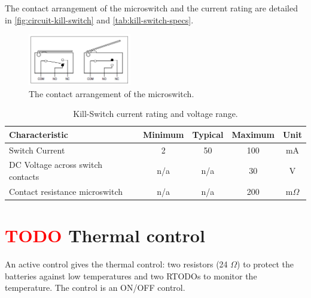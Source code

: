 The contact arrangement of the microswitch and the current rating are detailed in \autoref{fig:circuit-kill-switch} and \autoref{tab:kill-switch-specs}.

\begin{figure}[!ht]
    \begin{center}
        \includegraphics[width=0.4\textwidth]{figures/subsystems/circuit-kill-switch}
        \caption{The contact arrangement of the microswitch.}
        \label{fig:circuit-kill-switch}
    \end{center}
\end{figure}

\begin{table}[!h]
    \centering
    \begin{tabular}{lcccc}
        \toprule[1.5pt]
        \textbf{Characteristic} & \textbf{Minimum} & \textbf{Typical} & \textbf{Maximum} & \textbf{Unit} \\
        \midrule
        Switch Current                      & 2     & 50    & 100   & mA \\
        DC Voltage across switch contacts   & n/a   & n/a   & 30    & V \\
        Contact resistance microswitch      & n/a   & n/a   & 200   & m$\Omega$ \\
        \bottomrule[1.5pt]
    \end{tabular}
    \caption{Kill-Switch current rating and voltage range.}
    \label{tab:kill-switch-specs}
\end{table}


\section{ \textcolor{red}{TODO} Thermal control}

An active control gives the thermal control: two resistors (24 $\Omega$) to protect the batteries against low temperatures and two RTODOs to monitor the temperature. The control is an ON/OFF control.



